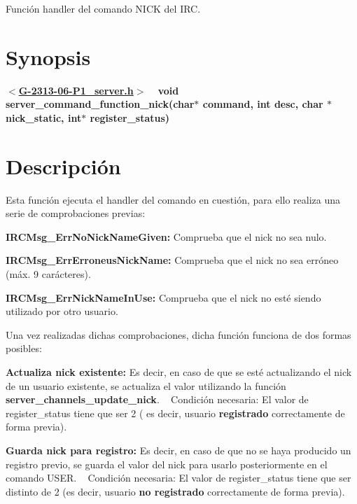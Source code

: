 Función handler del comando N\+I\+C\+K del I\+R\+C.\hypertarget{server_command_nick_synopsis_nick}{}\section{Synopsis}\label{server_command_nick_synopsis_nick}
{ {\bfseries $<$\hyperlink{G-2313-06-P1__server_8h_source}{G-\/2313-\/06-\/\+P1\+\_\+server.\+h}$>$} ~\newline
 {\bfseries void server\+\_\+command\+\_\+function\+\_\+nick(char$\ast$ command, int desc, char $\ast$ nick\+\_\+static, int$\ast$ register\+\_\+status)} } \hypertarget{server_command_nick_descripcion_nick}{}\section{Descripción}\label{server_command_nick_descripcion_nick}
Esta función ejecuta el handler del comando en cuestión, para ello realiza una serie de comprobaciones previas\+:


\begin{DoxyItemize}
\item {\bfseries I\+R\+C\+Msg\+\_\+\+Err\+No\+Nick\+Name\+Given\+:} Comprueba que el nick no sea nulo. 
\item {\bfseries I\+R\+C\+Msg\+\_\+\+Err\+Erroneus\+Nick\+Name\+:} Comprueba que el nick no sea erróneo (máx. 9 carácteres). 
\item {\bfseries I\+R\+C\+Msg\+\_\+\+Err\+Nick\+Name\+In\+Use\+:} Comprueba que el nick no esté siendo utilizado por otro usuario. 
\end{DoxyItemize}

Una vez realizadas dichas comprobaciones, dicha función funciona de dos formas posibles\+:


\begin{DoxyItemize}
\item {\bfseries Actualiza nick existente\+:} Es decir, en caso de que se esté actualizando el nick de un usuario existente, se actualiza el valor utilizando la función {\bfseries server\+\_\+channels\+\_\+update\+\_\+nick}. ~\newline
Condición necesaria\+: El valor de register\+\_\+status tiene que ser 2 ( es decir, usuario {\bfseries registrado} correctamente de forma previa).  
\item {\bfseries Guarda nick para registro\+:} Es decir, en caso de que no se haya producido un registro previo, se guarda el valor del nick para usarlo posteriormente en el comando U\+S\+E\+R. ~\newline
Condición necesaria\+: El valor de register\+\_\+status tiene que ser distinto de 2 (es decir, usuario {\bfseries no registrado} correctamente de forma previa).  
\end{DoxyItemize}

